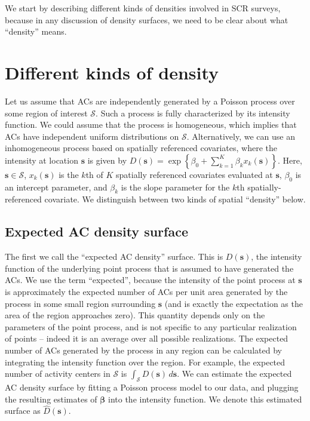 \documentclass[useAMS,usenatbib,referee]{biom}
\begin{document}
We start by describing different kinds of densities involved in SCR surveys, because in any discussion of density surfaces, we need to be clear about what ``density'' means. 

\section{Different kinds of density}\label{different-densities}

Let us assume that ACs are independently generated by a Poisson process over some region of interest $\mathcal{S}$. Such a process is fully characterized by its intensity function. We could assume that the process is homogeneous, which implies that ACs have independent uniform distributions on $\mathcal{S}$. Alternatively, we can use an inhomogeneous process based on spatially referenced covariates, where the intensity at location $\bm{s}$ is given by $D(\bm{s})=\exp\left\{\beta_0 + \sum_{k=1}^K\beta_kx_k(\bm{s})\right\}$. Here, $\bm{s} \in \mathcal{S}$, $x_k(\bm{s})$ is the $k$th of $K$ spatially referenced covariates evaluated at $\bm{s}$, $\beta_0$ is an intercept parameter, and $\beta_k$ is the slope parameter for the $k$th spatially-referenced covariate. We distinguish between two kinds of spatial ``density'' below. 

\subsection{Expected AC density surface} \label{s:eacd}

The first we call the ``expected AC density'' surface. This is $D(\bm{s})$, the intensity function of the underlying point process that is assumed to have generated the ACs. We use the term ``expected'', because the intensity of the point process at $\bm{s}$ is approximately the expected number of ACs per unit area generated by the process in some small region surrounding $\bm{s}$ (and is exactly the expectation as the area of the region approaches zero). This quantity depends only on the parameters of the point process, and is not specific to any particular realization of points -- indeed it is an average over all possible realizations. The expected number of ACs generated by the process in any region can be calculated by integrating the intensity function over the region. For example, the expected number of activity centers in $\mathcal{S}$ is $\int_{\mathcal{S}} D(\bm{s}) \, d\bm{s}$. We can estimate the expected AC density surface by fitting a Poisson process model to our data, and plugging the resulting estimates of $\bm{\beta}$ into the intensity function. We denote this estimated surface as $\widehat{D}(\bm{s})$. 
\end{document}
